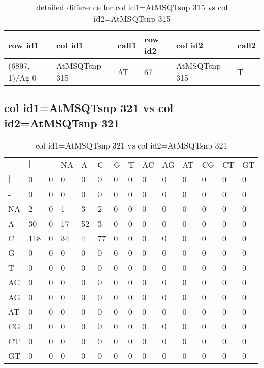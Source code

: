 \begin{center}
\begin{longtable}{|l|l|l|l|l|l|}
\caption{detailed difference for col id1=AtMSQTsnp 315 vs col id2=AtMSQTsnp 315} \label{table_dm855}\\
\hline
row id1&col id1&call1&row id2&col id2&call2\\
\hline
(6897, 1)/Ag-0&AtMSQTsnp 315&AT&67&AtMSQTsnp 315&T\\
\hline
\end{longtable}
\end{center}

\subsection{col id1=AtMSQTsnp 321 vs col id2=AtMSQTsnp 321}
\begin{center}
\begin{longtable}{|l|l|l|l|l|l|l|l|l|l|l|l|l|l|}
\caption{col id1=AtMSQTsnp 321 vs col id2=AtMSQTsnp 321} \label{table_dm856}\\
\hline
\\
\hline
&$|$&-&NA&A&C&G&T&AC&AG&AT&CG&CT&GT\\
$|$&0&0&0&0&0&0&0&0&0&0&0&0&0\\
-&0&0&0&0&0&0&0&0&0&0&0&0&0\\
NA&2&0&1&3&2&0&0&0&0&0&0&0&0\\
A&30&0&17&52&3&0&0&0&0&0&0&0&0\\
C&118&0&34&4&77&0&0&0&0&0&0&0&0\\
G&0&0&0&0&0&0&0&0&0&0&0&0&0\\
T&0&0&0&0&0&0&0&0&0&0&0&0&0\\
AC&0&0&0&0&0&0&0&0&0&0&0&0&0\\
AG&0&0&0&0&0&0&0&0&0&0&0&0&0\\
AT&0&0&0&0&0&0&0&0&0&0&0&0&0\\
CG&0&0&0&0&0&0&0&0&0&0&0&0&0\\
CT&0&0&0&0&0&0&0&0&0&0&0&0&0\\
GT&0&0&0&0&0&0&0&0&0&0&0&0&0\\
\hline
\end{longtable}
\end{center}

